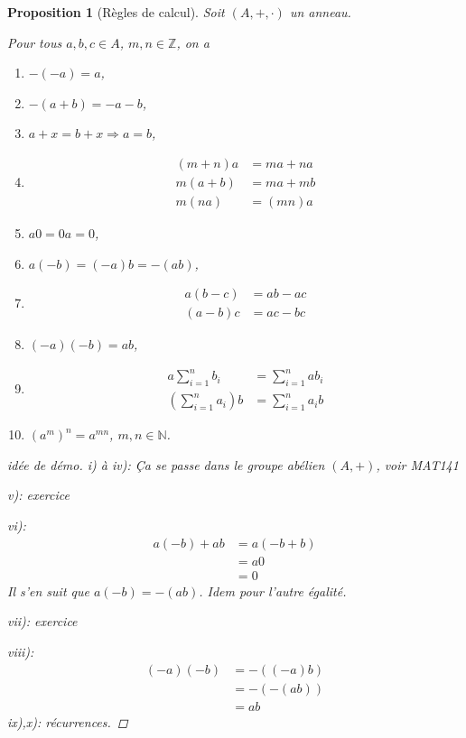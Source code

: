 \documentclass{report}
\newtheorem*{prop}{Proposition}
\theoremstyle{definition}
\theoremstyle{remark}
\newenvironment*{subproof}[1][D\'emonstration]
{
\begin{proof}[#1]

}
{
\renewcommand{\qedsymbol}{$\blacksquare$}
\end{proof}
\renewcommand{\qedsymbol}{$\square$}
}
\def\ZZ{\mathbb{Z}}
\begin{document}
	\begin{prop}[R\`egles de calcul]
		Soit $(A,+,\cdot)$ un anneau.

		Pour tous $a,b,c \in A$, $m,n \in \ZZ$, on a
		\begin{enumerate}[label=\roman*)]
			\item $-(-a)=a$,
			\item $-(a+b)=-a-b$,
			\item $a+x=b+x \Rightarrow a=b$,
			\item \begin{align*}
				(m+n)a&= ma+na\\
				m(a+b)&= ma+mb\\
				m(na)&= (mn)a
			\end{align*}
			\item $a0=0a=0$,
			\item $a(-b)=(-a)b=-(ab)$,
			\item \begin{align*}
				a(b-c)&= ab-ac\\
				(a-b)c&= ac-bc
			\end{align*}
			\item $(-a)(-b)=ab$,
			\item \begin{align*}
				a\sum_{i=1}^{n} b_i&= \sum_{i=1}^{n} ab_i\\
				\left( \sum_{i=1}^{n} a_i \right)b&= \sum_{i=1}^{n} a_ib
			\end{align*}
			\item $(a^m)^n = a^{mn}$, $m,n \in \mathbb{N}$.
		\end{enumerate}

		\begin{subproof}[id\'ee de d\'emo]
			i) \`a iv): \c Ca se passe dans le groupe ab\'elien $(A,+)$, voir MAT141

			v): exercice

			vi): \begin{align*}
				a(-b)+ab&= a(-b+b)\\
				&= a0\\
				&= 0
			\end{align*}
			Il s'en suit que $a(-b)=-(ab)$. Idem pour l'autre \'egalit\'e.

			vii): exercice

			viii): \begin{align*}
				(-a)(-b)&= -((-a)b)\\
				&= -(-(ab))\\
				&= ab
			\end{align*}
			ix),x): r\'ecurrences.
		\end{subproof}
	\end{prop}
\end{document}
